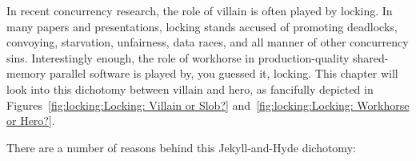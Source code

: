 
%

In recent concurrency research, the role of villain is often played
by locking.
In many papers and presentations,
locking stands accused of promoting deadlocks, convoying, starvation,
unfairness, data races, and all manner of other concurrency sins.
Interestingly enough, the role of workhorse in production-quality
shared-memory parallel software is played by, you guessed it, locking.
This chapter will look into this dichotomy between villain and
hero, as fancifully depicted in
Figures~\ref{fig:locking:Locking: Villain or Slob?}
and~\ref{fig:locking:Locking: Workhorse or Hero?}.

There are a number of reasons behind this Jekyll-and-Hyde dichotomy:

